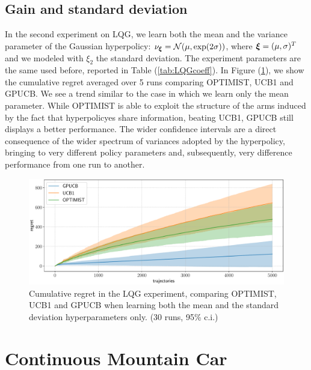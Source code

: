 \subsection{Gain and standard deviation}
In the second experiment on \gls{LQG}, we learn both the mean and the variance parameter of the Gaussian hyperpolicy: $\nu_{\boldsymbol{\xi}} = \mathcal{N}(\mu, \exp(2\sigma))$, where $\boldsymbol{\xi}=(\mu,\sigma)^T$ and we modeled with $\xi_2$ the standard deviation. The experiment parameters are the same used before, reported in Table (\ref{tab:LQGcoeff}).
In Figure (\ref{fig:LQGcomparisonVar}), we show the cumulative regret averaged over 5 runs comparing \gls{OPTIMIST}, \gls{UCB}1 and \gls{GPUCB}. We see a trend similar to the case in which we learn only the mean parameter. While \gls{OPTIMIST} is able to exploit the structure of the arms induced by the fact that hyperpolicyes share information, beating \gls{UCB}1, \gls{GPUCB} still displays a better performance. The wider confidence intervals are a direct consequence of the wider spectrum of variances adopted by the hyperpolicy, bringing to very different policy parameters and, subsequently, very difference performance from one run to another.

\begin{figure}[t!] 
\centering
\includegraphics[width=\textwidth,height=\textheight,keepaspectratio]{Images/LQGcomparisonVar.pdf}
\caption{Cumulative regret in
the \gls{LQG} experiment, comparing
\gls{OPTIMIST}, \gls{UCB}1 and \gls{GPUCB} when learning both the mean and the standard deviation hyperparameters only.
(30 runs, 95\% c.i.)} 
\label{fig:LQGcomparisonVar} 
\end{figure}


\section{Continuous Mountain Car}

